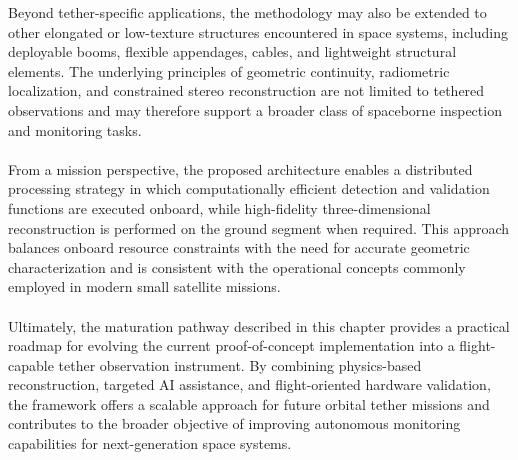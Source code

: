 Beyond tether-specific applications, the methodology may also be extended to other elongated or low-texture structures encountered in space systems, including deployable booms, flexible appendages, cables, and lightweight structural elements. The underlying principles of geometric continuity, radiometric localization, and constrained stereo reconstruction are not limited to tethered observations and may therefore support a broader class of spaceborne inspection and monitoring tasks.
\\\\
From a mission perspective, the proposed architecture enables a distributed processing strategy in which computationally efficient detection and validation functions are executed onboard, while high-fidelity three-dimensional reconstruction is performed on the ground segment when required. This approach balances onboard resource constraints with the need for accurate geometric characterization and is consistent with the operational concepts commonly employed in modern small satellite missions.
\\\\
Ultimately, the maturation pathway described in this chapter provides a practical roadmap for evolving the current proof-of-concept implementation into a flight-capable tether observation instrument. By combining physics-based reconstruction, targeted AI assistance, and flight-oriented hardware validation, the framework offers a scalable approach for future orbital tether missions and contributes to the broader objective of improving autonomous monitoring capabilities for next-generation space systems.
